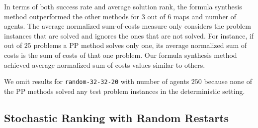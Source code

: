 \documentclass[letterpaper]{article}
\begin{document}
In terms of both success rate and average solution rank, the formula synthesis method outperformed the other methods for $ 3 $ out of $ 6 $ maps and number of agents. The average normalized sum-of-costs measure only considers the problem instances that are solved and ignores the ones that are not solved. For instance, if out of $ 25 $ problems a PP method solves only one, its average normalized sum of costs is the sum of costs of that one problem. Our formula synthesis method achieved average normalized sum of costs values similar to others.

We omit results for {\tt random-32-32-20} with number of agents $ 250 $ because none of the PP methods solved any test problem instances in the deterministic setting.


\subsection{Stochastic Ranking with Random Restarts}
\label{sec:stoRankings}
\end{document}
